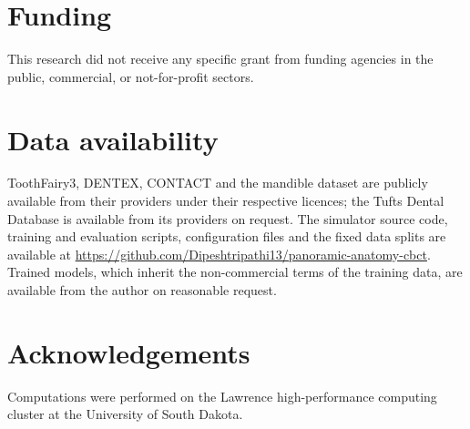 \documentclass[preprint,12pt]{elsarticle}
\begin{document}
\section*{Funding}
This research did not receive any specific grant from funding agencies in the public, commercial, or not-for-profit
sectors.

\section*{Data availability}
ToothFairy3, DENTEX, CONTACT and the mandible dataset are publicly available from their providers under their respective
licences; the Tufts Dental Database is available from its providers on request. The
simulator source code, training and evaluation scripts, configuration files and the fixed data splits are available at
\url{https://github.com/Dipeshtripathi13/panoramic-anatomy-cbct}. Trained models, which inherit the non-commercial terms
of the training data, are available from the author on reasonable request.

\section*{Acknowledgements}
Computations were performed on the Lawrence high-performance computing cluster at the University of South Dakota.



\end{document}
